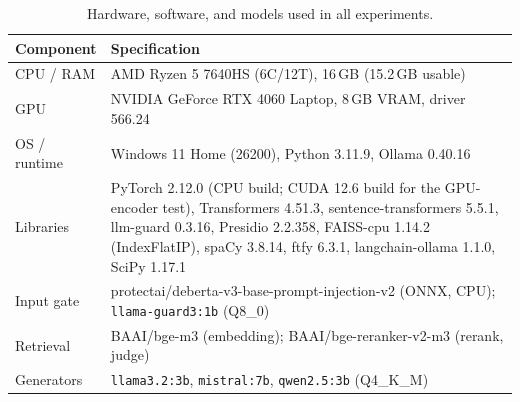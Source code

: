 \documentclass[conference]{IEEEtran}
\begin{document}
\begin{table}[t]
\centering
\caption{Hardware, software, and models used in all experiments.}
\label{tab:env}
\setlength{\tabcolsep}{3pt}
\small
\begin{tabular}{p{2.3cm}p{5.6cm}}
\toprule
Component & Specification \\
\midrule
CPU / RAM & AMD Ryzen 5 7640HS (6C/12T), 16\,GB (15.2\,GB usable) \\
GPU & NVIDIA GeForce RTX 4060 Laptop, 8\,GB VRAM, driver 566.24 \\
OS / runtime & Windows 11 Home (26200), Python 3.11.9, Ollama 0.40.16 \\
Libraries & PyTorch 2.12.0 (CPU build; CUDA 12.6 build for the GPU-encoder test), Transformers 4.51.3, sentence-transformers 5.5.1, llm-guard 0.3.16, Presidio 2.2.358, FAISS-cpu 1.14.2 (IndexFlatIP), spaCy 3.8.14, ftfy 6.3.1, langchain-ollama 1.1.0, SciPy 1.17.1 \\
Input gate & protectai/deberta-v3-base-prompt-injection-v2 (ONNX, CPU); \texttt{llama-guard3:1b} (Q8\_0) \\
Retrieval & BAAI/bge-m3 (embedding); BAAI/bge-reranker-v2-m3 (rerank, judge) \\
Generators & \texttt{llama3.2:3b}, \texttt{mistral:7b}, \texttt{qwen2.5:3b} (Q4\_K\_M) \\
\bottomrule
\end{tabular}
\end{table}
\end{document}

